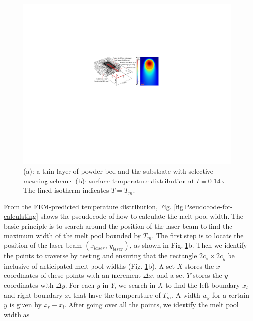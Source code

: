 \documentclass [11pt, proquest] {uwthesis}[2020/02/24]
\begin{document}
\begin{figure}[!ht]
\begin{centering}
\includegraphics[clip,width=13cm]{Closed-loop-simulation/mesh_temp_distri}
\par\end{centering}
\centering{}\caption{\label{fig:Mesh-and-scan}(a): a thin layer of powder bed and the
substrate with selective meshing scheme. (b): surface temperature
distribution at $t=0.14\,\text{s}$. The lined isotherm indicates
$T=T_{m}$.}
\end{figure}
From the FEM-predicted temperature distribution, Fig. \ref{fig:Pseudocode-for-calculating}
shows the pseudocode of how to calculate the melt pool width. The
basic principle is to search around the position of the laser beam
to find the maximum width of the melt pool bounded by $T_{m}$. The
first step is to locate the position of the laser beam $(x_{laser},\,y_{laser})$,
as shown in Fig. \ref{fig:Mesh-and-scan}b. Then we identify the points
to traverse by testing and ensuring that the rectangle $2c_{x}\times2c_{y}$
be inclusive of anticipated melt pool widths (Fig. \ref{fig:Mesh-and-scan}b).
A set $X$ stores the $x$ coordinates of these points with an increment
$\Delta x$, and a set $Y$ stores the $y$ coordinates with $\Delta y$.
For each $y$ in $Y$, we search in $X$ to find the left boundary
$x_{l}$ and right boundary $x_{r}$ that have the temperature of
$T_{m}$. A width $w_{y}$ for a certain $y$ is given by $x_{r}-x_{l}$.
After going over all the points, we identify the melt pool width as
\end{document}
